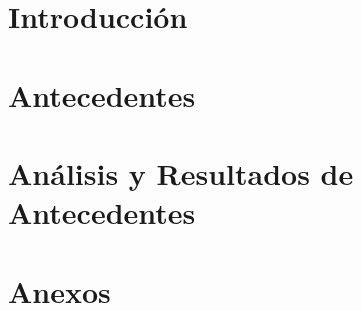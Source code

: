 \documentclass[11pt,letterpaper]{article}
\begin{document}

\tableofcontents
\newpage

\section{Introducción}
\label{sec:introduccion}


\section{Antecedentes}
\label{sec:antecedentes}


\section{Análisis y Resultados de Antecedentes}
\label{sec:analisis}


\newpage


\section{Anexos}
\label{sec:anexos}

\end{document}
